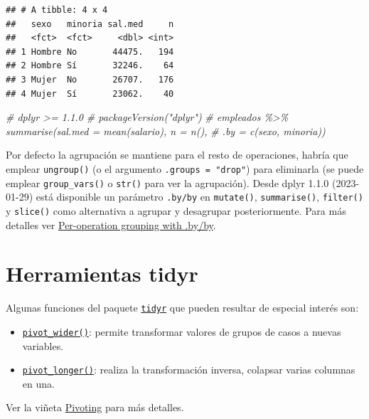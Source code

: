 \documentclass[
]{book}
\newenvironment{Shaded}{\begin{snugshade}}{\end{snugshade}}
\newcommand{\CommentTok}[1]{\textcolor[rgb]{0.56,0.35,0.01}{\textit{#1}}}
\providecommand{\tightlist}{%
  \setlength{\itemsep}{0pt}\setlength{\parskip}{0pt}}
\theoremstyle{break}
\theoremstyle{nonumberplain}
\begin{document}
\begin{verbatim}
## # A tibble: 4 x 4
##   sexo   minoria sal.med     n
##   <fct>  <fct>     <dbl> <int>
## 1 Hombre No       44475.   194
## 2 Hombre Sí       32246.    64
## 3 Mujer  No       26707.   176
## 4 Mujer  Sí       23062.    40
\end{verbatim}

\begin{Shaded}
\begin{Highlighting}[]
\CommentTok{\# dplyr \textgreater{}= 1.1.0 \# packageVersion("dplyr")}
\CommentTok{\# empleados \%\textgreater{}\% summarise(sal.med = mean(salario), n = n(), }
\CommentTok{\#                         .by = c(sexo, minoria))}
\end{Highlighting}
\end{Shaded}

Por defecto la agrupación se mantiene para el resto de operaciones, habría que emplear \texttt{ungroup()} (o el argumento \texttt{.groups\ =\ "drop"}) para eliminarla (se puede emplear \texttt{group\_vars()} o \texttt{str()} para ver la agrupación).
Desde dplyr 1.1.0 (2023-01-29) está disponible un parámetro \texttt{.by/by} en \texttt{mutate()}, \texttt{summarise()}, \texttt{filter()} y \texttt{slice()} como alternativa a agrupar y desagrupar posteriormente.
Para más detalles ver \href{https://dplyr.tidyverse.org/reference/dplyr_by.html}{Per-operation grouping with .by/by}.

\hypertarget{herramientas-tidyr}{%
\section{Herramientas tidyr}\label{herramientas-tidyr}}

Algunas funciones del paquete \href{https://tidyr.tidyverse.org}{\texttt{tidyr}} que pueden resultar de especial interés son:

\begin{itemize}
\tightlist
\item
  \href{https://tidyr.tidyverse.org/reference/pivot_wider.html}{\texttt{pivot\_wider()}}: permite transformar valores de grupos de casos a nuevas variables.
\item
  \href{https://tidyr.tidyverse.org/reference/pivot_longer.html}{\texttt{pivot\_longer()}}: realiza la transformación inversa, colapsar varias columnas en una.
\end{itemize}

Ver la viñeta \href{https://tidyr.tidyverse.org/articles/pivot.html}{Pivoting} para más detalles.
\end{document}

